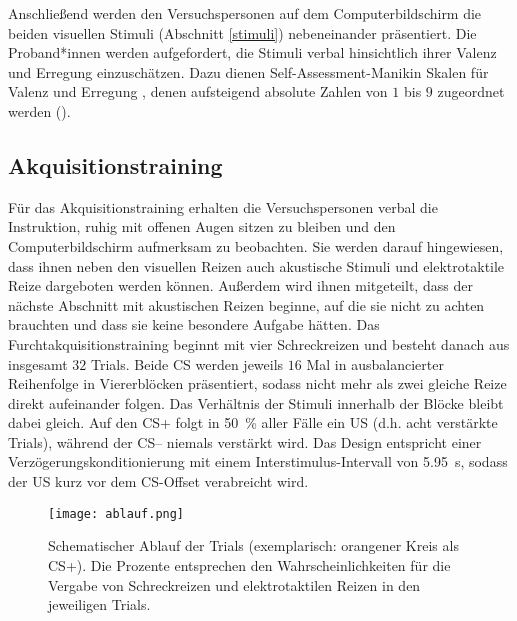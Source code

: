 						Anschließend werden den Versuchspersonen auf dem Computerbildschirm die beiden visuellen Stimuli (Abschnitt \ref{stimuli}) nebeneinander präsentiert. Die Proband*innen werden aufgefordert, die Stimuli verbal hinsichtlich ihrer Valenz und Erregung einzuschätzen. Dazu dienen Self-Assessment-Manikin Skalen für Valenz und Erregung \parencite[SAM;][]{BRADLEY1994}, denen aufsteigend absolute Zahlen von $1$ bis $9$ zugeordnet werden ().
	
			
			\subsection{Akquisitionstraining}\label{acq}		
			
					 	Für das Akquisitionstraining erhalten die Versuchspersonen verbal die Instruktion, ruhig mit offenen Augen sitzen zu bleiben und den Computerbildschirm aufmerksam zu beobachten. Sie werden darauf hingewiesen, dass ihnen neben den visuellen Reizen auch akustische Stimuli und elektrotaktile Reize dargeboten werden können. Außerdem wird ihnen mitgeteilt, dass der nächste Abschnitt mit akustischen Reizen beginne, auf die sie nicht zu achten brauchten und dass sie keine besondere Aufgabe hätten.
					 	Das Furchtakquisitionstraining beginnt mit vier Schreckreizen und besteht danach aus insgesamt $32$ Trials. Beide CS werden jeweils $16$ Mal in ausbalancierter Reihenfolge in Viererblöcken präsentiert, sodass nicht mehr als zwei gleiche Reize direkt aufeinander folgen. Das Verhältnis der Stimuli innerhalb der Blöcke bleibt dabei gleich. Auf den CS+ folgt in \SI{50}{\percent} aller Fälle ein US (d.h. acht verstärkte Trials), während der CS-- niemals verstärkt wird. Das Design entspricht einer Verzögerungskonditionierung mit einem Interstimulus-Intervall von \SI{5.95}{\second}, sodass der US kurz vor dem CS-Offset verabreicht wird. 
					 		\begin{figure}[h]
					 			\begin{center}
					 			\texttt{[image: ablauf.png]}
					 			\caption[Schematischer Ablauf der Trials]{Schematischer Ablauf der Trials (exemplarisch: orangener Kreis als CS+). Die Prozente entsprechen den Wahrscheinlichkeiten für die Vergabe von Schreckreizen und elektrotaktilen Reizen in den jeweiligen Trials.}
					 			\label{fig:ablauf}
					 	\end{center}\end{figure}
				 	
